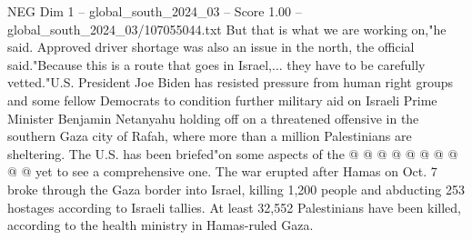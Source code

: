 \begin{textsample}{NEG Dim 1 – global\_south\_2024\_03 – Score 1.00 – global\_south\_2024\_03/107055044.txt}
But that is what we are working on,"he said.
Approved driver shortage was also an issue in the north, the official said."Because this is a route that goes in Israel,... they have to be carefully vetted."U.S.
President Joe Biden has resisted pressure from human right groups and some fellow Democrats to condition further military aid on Israeli Prime Minister Benjamin Netanyahu holding off on a threatened offensive in the southern Gaza city of Rafah, where more than a million Palestinians are sheltering.
The U.S. has been briefed"on some aspects of the @ @ @ @ @ @ @ @ @ @ yet to see a comprehensive one.
The war erupted after Hamas on Oct. 7 broke through the Gaza border into Israel, killing 1,200 people and abducting 253 hostages according to Israeli tallies.
At least 32,552 Palestinians have been killed, according to the health ministry in Hamas-ruled Gaza.

\end{textsample}
